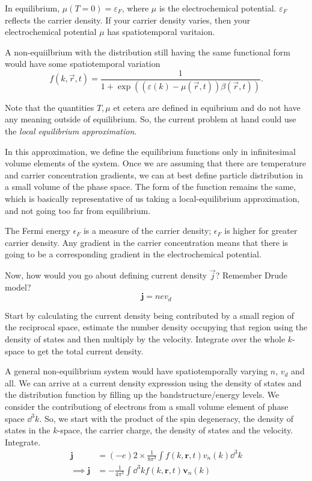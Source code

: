 \documentclass[a4paper]{article}
\begin{document}
In equilibrium, $\mu(T=0) = \varepsilon_F$, where $\mu$ is the electrochemical potential.
$\varepsilon_F$ reflects the carrier density. If your carrier density
varies, then your electrochemical potential $\mu$ has spatiotemporal
varitaion.

A non-equiilbrium with the distribution still having the same functional
form would have some spatiotemporal variation
\begin{equation}
	f(k,\vec{r},t) = \frac{1}{1 + \exp\left(\left( \varepsilon(k) - \mu(\vec r,t) \right)\beta(\vec{r}, t)\right) }.
\end{equation}

Note that the quantities $T, \mu$ et cetera are defined in equibrium
and do not have any meaning outside of equilibrium. So, the current
problem at hand could use the \emph{local equilibrium approximation}.

In this approximation, we define the equilibrium functions only in
infinitesimal volume elements of the system. Once we are assuming that there are temperature and carrier concentration
gradients, we can at best define particle distribution in a small
volume of the phase space. The form of the function remains the same,
which is basically representative of us taking a local-equilibrium
approximation, and not going too far from equilibrium.

The Fermi energy $\epsilon_F$ is a measure of the carrier density;
$\epsilon_F$ is higher for greater carrier density. Any gradient
in the carrier concentration means that there is going to be a
corresponding gradient in the electrochemical potential.

Now, how would you go about defining current density $\vec{j}$?
Remember Drude model?
\begin{equation}
	\mathbf{j} = nev_d
\end{equation}

Start by calculating the current density being contributed by a small
region of the reciprocal space, estimate the number density occupying
that region using the density of states and then multiply by the
velocity. Integrate over the whole $k$-space to get the total current
density.

A general non-equilibrium system would have spatiotemporally varying
$n$, $v_d$ and all. We can arrive at a current density expression using
the density of states and the distribution function by filling up the
bandstructure/energy levels. We consider the contributiong of electrons
from a small volume element of phase space  $\dd ^3 k$. So, we start
with the product of the spin degeneracy, the density of states in the $k$-space, the carrier charge, the density of states and the velocity. Integrate.
\begin{equation} \label{current_density}
	\begin{split}
		\mathbf{j} &= (-e)2\times \frac{1}{8\pi^3}\int f(k, \mathbf{r}, t)v_n(k)\dd^3k\\
		\implies \mathbf{j} &= -\frac{1}{4\pi^3}\int \dd ^3 k f(k, \mathbf{r}, t)\textbf{v}_n(k)
	\end{split}
\end{equation}
\end{document}
